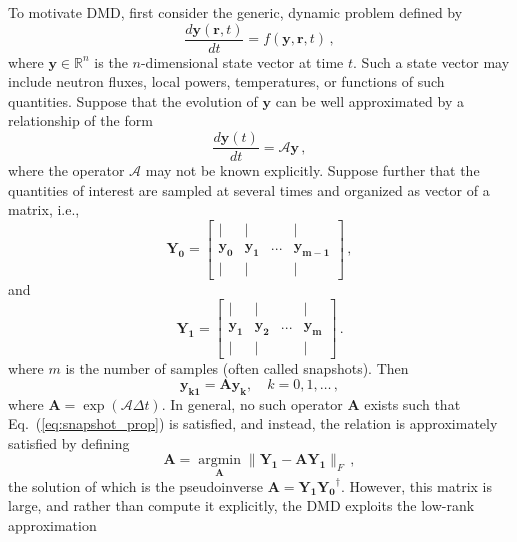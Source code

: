 \documentclass{anstrans}
\renewcommand{\vec}[1]{\bm{#1}} %
\DeclareMathOperator*{\argmin}{argmin}
\begin{document}
To motivate DMD, first consider the generic, dynamic problem defined by
\begin{equation}
  \frac{d{\vec{y} }(\vec{r},t)}{dt}=f(\vec{y},\vec{r},t) \, ,
\end{equation}
where ${\vec{y}} \in \mathbb{R}^{n}$ is the $n$-dimensional state vector at time $t$.  
Such a state vector may include neutron fluxes, local powers, temperatures, or functions of such quantities.
Suppose that the evolution of $\vec{y}$ can be well approximated by a relationship of the form  
\begin{equation}
 \frac{d{\vec{y}}(t)}{dt}=\mathcal{A}\vec{y} \, ,
\end{equation}
where the operator $\mathcal{A}$ may not be known explicitly. 
Suppose further that the quantities of interest are sampled at several times and organized as vector of a matrix, i.e.,
\begin{equation}
\mathbf{Y_0}=\left[\begin{array}{cccc}
| & | &   & | \\ 
{\vec{y_0}} &  {\vec{y_1}} & ... & {\vec{y_{m-1}}} \\ 
| & | &  & |
\end{array} \right]\, ,
\end{equation}
and
\begin{equation}
{\mathbf{Y_1}}=\left[\begin{array}{cccc}
| & | &  & | \\ 
{\vec{y_1}} &  {\vec{y_2}} & ... & {\vec{y_{m}}} \\ 
| & | &  & |
\end{array} \right] \, .
\end{equation}
where $m$ is the number of samples (often called snapshots).  
Then
\begin{equation}
  \vec{y_{k1}}=\mathbf{A}\vec{y_{k}}, \quad k = 0, 1, \ldots \, ,
\label{eq:snapshot_prop}
\end{equation}
where $\mathbf{A}=\exp(\mathcal{A}\Delta t)$.  
In general, no such operator $\mathbf{A}$ exists such that Eq.~(\ref{eq:snapshot_prop}) is satisfied, and instead, the relation is approximately satisfied by defining
\begin{equation}
\label{eq:AOpt}
    \mathbf{A}=\argmin\limits_{\mathbf{A}}\|\mathbf{Y_{1}} -\mathbf{AY_{1}}\|_F \, ,
\end{equation}
the solution of which is the pseudoinverse $\mathbf{A}=\mathbf{Y_1}\mathbf{{{Y}_{0}}^{\dagger}}$.
However, this matrix is large, and rather than compute it explicitly, the DMD exploits the low-rank approximation
\end{document}
